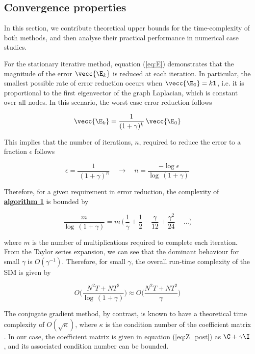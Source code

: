 \subsection{Convergence properties}


In this section, we contribute theoretical upper bounds for the time-complexity of both methods, and then analyse their practical performance in numerical case studies. 

For the stationary iterative method, equation (\ref{eq:E}) demonstrates that the magnitude of the error $\vecc{\E_k}$ is reduced at each iteration. In particular, the smallest possible rate of error reduction occurs when $\vecc{\E_0} = k\mathbf{1}$, i.e. it is proportional to the first eigenvector of the graph Laplacian, which is constant over all nodes. In this scenario, the worst-case error reduction follows

\begin{equation}
\label{eq:sim_error_series}
    \vecc{\E_k} =  \frac{1}{ (1 + \gamma)^k} \, \vecc{\E_0}
\end{equation}

This implies that the number of iterations, $n$, required to reduce the error to a fraction $\epsilon$ follows

$$
\epsilon = \frac{1}{\,(1 + \gamma)^n} \quad \rightarrow \quad n = \frac{-\log \epsilon}{\log\,(1 + \gamma)}
$$

Therefore, for a given requirement in error reduction, the complexity of \hyperlink{al1}{\textbf{algorithm 1}} is bounded by 

$$
\frac{m}{\log\,(1 + \gamma)} = m \, \Big( \, \frac{1}{\gamma} + \frac{1}{2} - \frac{\gamma}{12} + \frac{\gamma^2}{24} - ... \Big)
$$

\noindent where $m$ is the number of multiplications required to complete each iteration. From the Taylor series expansion, we can see that the dominant behaviour for small $\gamma$ is $O(\gamma^{-1})$. Therefore, for small $\gamma$, the overall run-time complexity of the SIM is given by 

\begin{equation}
\label{eq:OSIM}
    O\Bigg(\frac{N^2T + NT^2}{\log\,(1 + \gamma)} \Bigg) \approx O\Bigg(\frac{N^2T + NT^2}{\gamma} \Bigg)
\end{equation}
 
The conjugate gradient method, by contrast, is known to have a theoretical time complexity of $O(\sqrt{\kappa})$,  where $\kappa$ is the condition number of the coefficient matrix  \cite{Kelley1995}. In our case, the coefficient matrix is given in equation (\ref{eq:Z_post}) as $\C + \gamma \I$, and its associated condition number can be bounded. 

